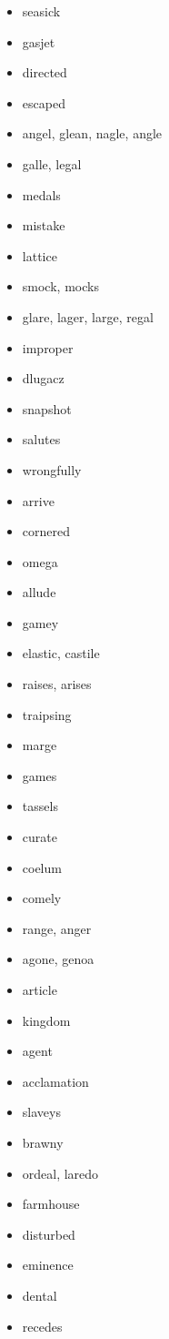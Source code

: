 \documentclass{article}
\begin{document}
\begin{itemize}
    \item seasick
    \item gasjet
    \item directed
    \item escaped
    \item angel, glean, nagle, angle
    \item galle, legal
    \item medals
    \item mistake
    \item lattice
    \item smock, mocks
    \item glare, lager, large, regal
    \item improper
    \item dlugacz
    \item snapshot
    \item salutes
    \item wrongfully
    \item arrive
    \item cornered
    \item omega
    \item allude
    \item gamey
    \item elastic, castile
    \item raises, arises
    \item traipsing
    \item marge
    \item games
    \item tassels
    \item curate
    \item coelum
    \item comely
    \item range, anger
    \item agone, genoa
    \item article
    \item kingdom
    \item agent
    \item acclamation
    \item slaveys
    \item brawny
    \item ordeal, laredo
    \item farmhouse
    \item disturbed
    \item eminence
    \item dental
    \item recedes

\end{itemize}
\end{document}
